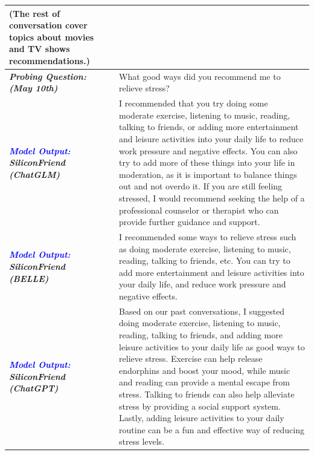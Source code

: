 \begin{table}[t]
\begin{tabular}{p{2.3cm}p{11cm}}
(The rest of conversation cover topics about movies and TV shows recommendations.)
\\
  \hline
  \parbox[t]{4cm}{\textbf{\textit{Probing Question:}} \\ \textbf{\textit{(May 10th)}}}&
  What good ways did you recommend me to relieve stress? \\
  \hline
   \parbox[t]{4cm}{\textcolor{blue}{\textbf{\textit{Model Output:}}} \\ \textbf{\textit{SiliconFriend}}\\ \textbf{\textit{(ChatGLM)}}} & I recommended that you try doing some moderate exercise, listening to music, reading, talking to friends, or adding more entertainment and leisure activities into your daily life to reduce work pressure and negative effects. You can also try to add more of these things into your life in moderation, as it is important to balance things out and not overdo it. If you are still feeling stressed, I would recommend seeking the help of a professional counselor or therapist who can provide further guidance and support.      
 \\
  \hline
  \parbox[t]{4cm}{\textcolor{blue}{\textbf{\textit{Model Output:}}} \\ \textbf{\textit{SiliconFriend}}\\ \textbf{\textit{(BELLE)}}} & I recommended some ways to relieve stress such as doing moderate exercise, listening to music, reading, talking to friends, etc. You can try to add more entertainment and leisure activities into your daily life, and reduce work pressure and negative effects.    
 \\
    \hline
\parbox[t]{4cm}{\textcolor{blue}{\textbf{\textit{Model Output:}}} \\ \textbf{\textit{SiliconFriend}}\\ \textbf{\textit{(ChatGPT)}}} & Based on our past conversations, I suggested doing moderate exercise, listening to music, reading, talking to friends, and adding more leisure activities to your daily life as good ways to relieve stress. Exercise can help release endorphins and boost your mood, while music and reading can provide a mental escape from stress. Talking to friends can also help alleviate stress by providing a social support system. Lastly, adding leisure activities to your daily routine can be a fun and effective way of reducing stress levels.   
 \\
\bottomrule  
\end{tabular}
\vspace{-0.15in}
\end{table}
